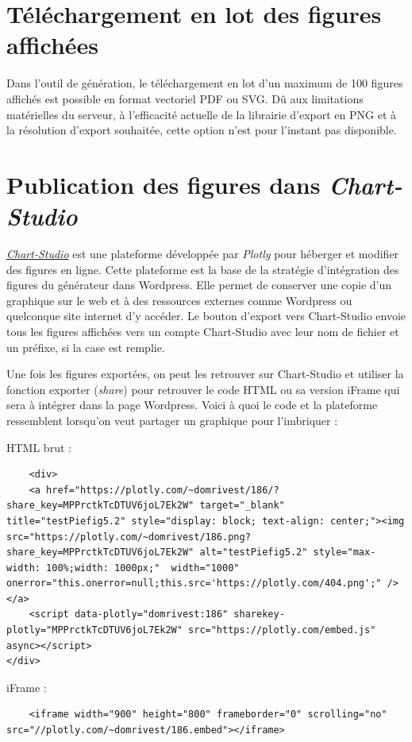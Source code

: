 \documentclass[11pt]{article}
\begin{document}
\section{Téléchargement en lot des figures affichées}

Dans l'outil de génération, le téléchargement en lot d'un maximum de 100 figures affichés est possible en format vectoriel PDF ou SVG. Dû aux limitations matérielles du serveur, à l'efficacité actuelle de la librairie d'export en PNG et à la résolution d'export souhaitée, cette option n'est pour l'instant pas disponible.

\section{Publication des figures dans \textit{Chart-Studio}}

\href{https://chart-studio.plotly.com/feed/#/}{\textit{Chart-Studio}} est une plateforme développée par \textit{Plotly} pour héberger et modifier des figures en ligne. Cette plateforme est la base de la stratégie d'intégration des figures du générateur dans Wordpress. Elle permet de conserver une copie d'un graphique sur le web et à des ressources externes comme Wordpress ou quelconque site internet d'y accéder. Le bouton d'export vers Chart-Studio envoie tous les figures affichées vers un compte Chart-Studio avec leur nom de fichier et un préfixe, si la case est remplie.

Une fois les figures exportées, on peut les retrouver sur Chart-Studio et utiliser la fonction exporter (\textit{share}) pour retrouver le code HTML ou sa version iFrame qui sera à intégrer dans la page Wordpress. Voici à quoi le code et la plateforme ressemblent lorsqu'on veut partager un graphique pour l'imbriquer :

HTML brut :
\begin{lstlisting}
    <div>
    <a href="https://plotly.com/~domrivest/186/?share_key=MPPrctkTcDTUV6joL7Ek2W" target="_blank" title="testPiefig5.2" style="display: block; text-align: center;"><img src="https://plotly.com/~domrivest/186.png?share_key=MPPrctkTcDTUV6joL7Ek2W" alt="testPiefig5.2" style="max-width: 100%;width: 1000px;"  width="1000" onerror="this.onerror=null;this.src='https://plotly.com/404.png';" /></a>
    <script data-plotly="domrivest:186" sharekey-plotly="MPPrctkTcDTUV6joL7Ek2W" src="https://plotly.com/embed.js" async></script>
</div>
\end{lstlisting}

iFrame :
\begin{lstlisting}
    <iframe width="900" height="800" frameborder="0" scrolling="no" src="//plotly.com/~domrivest/186.embed"></iframe>
\end{lstlisting}
\end{document}
